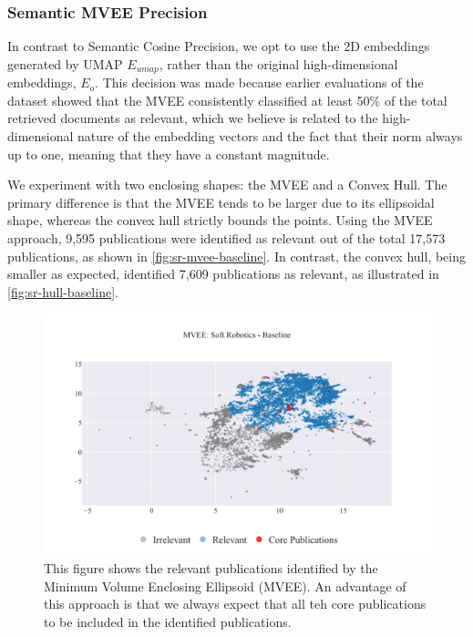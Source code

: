 \subsubsection{Semantic MVEE Precision}

In contrast to Semantic Cosine Precision, we opt to use the 2D embeddings generated by UMAP $E_{umap}$, rather than the original high-dimensional embeddings, $E_o$. This decision was made because earlier evaluations of the dataset showed that the MVEE consistently classified at least 50\% of the total retrieved documents as relevant, which we believe is related to the high-dimensional nature of the embedding vectors and the fact that their norm always up to one, meaning that they have a constant magnitude.

We experiment with two enclosing shapes: the MVEE and a Convex Hull. The primary difference is that the MVEE tends to be larger due to its ellipsoidal shape, whereas the convex hull strictly bounds the points. Using the MVEE approach, 9,595 publications were identified as relevant out of the total 17,573 publications, as shown in \autoref{fig:sr-mvee-baseline}. In contrast, the convex hull, being smaller as expected, identified 7,609 publications as relevant, as illustrated in \autoref{fig:sr-hull-baseline}.

\begin{figure}
	\centering	
	\includegraphics[scale=0.6]{pics/sr-mvee-baseline.pdf}
	\caption[Semantic MVEE: Soft Robotics]{This figure shows the relevant publications identified by the Minimum Volume Enclosing Ellipsoid (MVEE). An advantage of this approach is that we always expect that all teh core publications to be included in the identified publications.}\label{fig:sr-mvee-baseline}
\end{figure}

